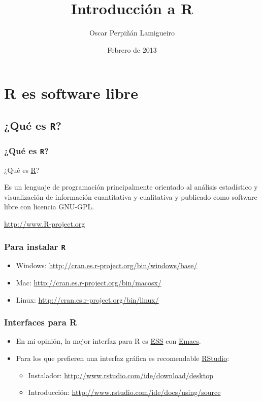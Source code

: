 \documentclass[xcolor={usenames,svgnames,dvipsnames}]{beamer}
\title{Introducción a R}
\author{Oscar Perpiñán Lamigueiro}
\date{Febrero de 2013}
\begin{document}
\maketitle


\section{R es software libre}
\label{sec-1}
\subsection{¿Qué es \texttt{R}?}
\label{sec-1-1}
\begin{frame}
\frametitle{¿Qué es \texttt{R}?}
\label{sec-1-1-1}
\begin{block}{¿Qué es \href{http://procomun.wordpress.com/2011/02/23/que-es-r/}{R}?}
\label{sec-1-1-1-1}

Es un lenguaje de programación principalmente orientado al
análisis estadístico y visualización de información cuantitativa y
cualitativa y publicado como software libre con licencia GNU-GPL.
\begin{center}
\href{http://www.R-project.org}{http://www.R-project.org} 
\end{center}
\end{block}
\end{frame}
\begin{frame}
\frametitle{Para instalar \texttt{R}}
\label{sec-1-1-2}


\begin{itemize}
\item Windows: \href{http://cran.es.r-project.org/bin/windows/base/}{http://cran.es.r-project.org/bin/windows/base/}
\item Mac: \href{http://cran.es.r-project.org/bin/macosx/}{http://cran.es.r-project.org/bin/macosx/}
\item Linux: \href{http://cran.es.r-project.org/bin/linux/}{http://cran.es.r-project.org/bin/linux/}
\end{itemize}
\end{frame}
\begin{frame}
\frametitle{Interfaces para R}
\label{sec-1-1-3}


\begin{itemize}
\item En mi opinión, la mejor interfaz para R es \href{http://ess.r-project.org/}{ESS} con \href{http://www.gnu.org/software/emacs/}{Emacs}.
\item Para los que prefieren una interfaz gráfica es recomendable \href{http://www.rstudio.com/ide/}{RStudio}:
\begin{itemize}
\item Instalador: \href{http://www.rstudio.com/ide/download/desktop}{http://www.rstudio.com/ide/download/desktop}
\item Introducción: \href{http://www.rstudio.com/ide/docs/using/source}{http://www.rstudio.com/ide/docs/using/source}
\end{itemize}
\end{itemize}
\end{frame}
\end{document}
